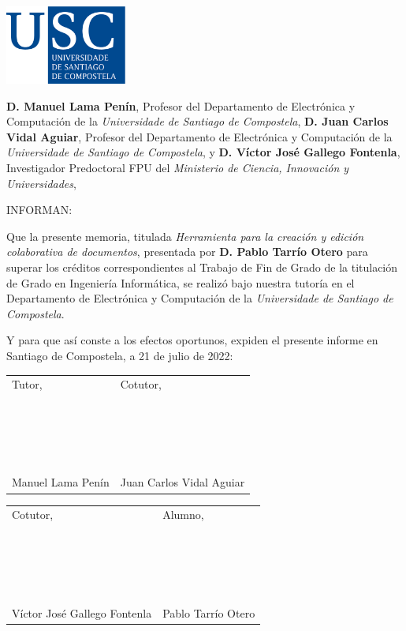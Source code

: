 \pagestyle{plain}
\includegraphics[width=4cm]{figuras/logo_usc.eps}

\vspace{1cm}
{\bf D. Manuel Lama Penín}, Profesor del Departamento de Electrónica y Computación de la {\it Universidade de Santiago de Compostela}, {\bf D. Juan Carlos Vidal Aguiar}, Profesor del Departamento de Electrónica y Computación de la {\it Universidade de Santiago de Compostela}, y {\bf D. Víctor José Gallego Fontenla}, Investigador Predoctoral FPU del {\it Ministerio de Ciencia, Innovación y Universidades},

\vspace{1cm}
INFORMAN:

\vspace{1cm}
Que la presente memoria, titulada {\it Herramienta para la creación y edición
colaborativa de documentos}, presentada por {\bf D. Pablo Tarrío Otero} para superar los créditos correspondientes al Trabajo de Fin de Grado de la titulación de Grado en Ingeniería Informática, se realizó bajo nuestra tutoría en el Departamento de Electrónica y Computación de la {\it Universidade de Santiago de Compostela}.

\vspace{1cm}
Y para que así conste a los efectos oportunos, expiden el presente informe en Santiago de Compostela, a 21 de julio de 2022:

\vspace{0.5cm}
\begin{tabular}{ll}
	Tutor, & \hspace{3.6cm} Cotutor, \\
	~ \\
	~ \\
	~ \\
	~ \\
	Manuel Lama Penín & \hspace{3.6cm} Juan Carlos Vidal Aguiar
\end{tabular}

\vspace{1cm}
\begin{tabular}{ll}
	Cotutor, & \hspace{2cm} Alumno, \\
	~ \\
	~ \\
	~ \\
	~ \\
	Víctor José Gallego Fontenla & \hspace{2cm} Pablo Tarrío Otero
\end{tabular}

